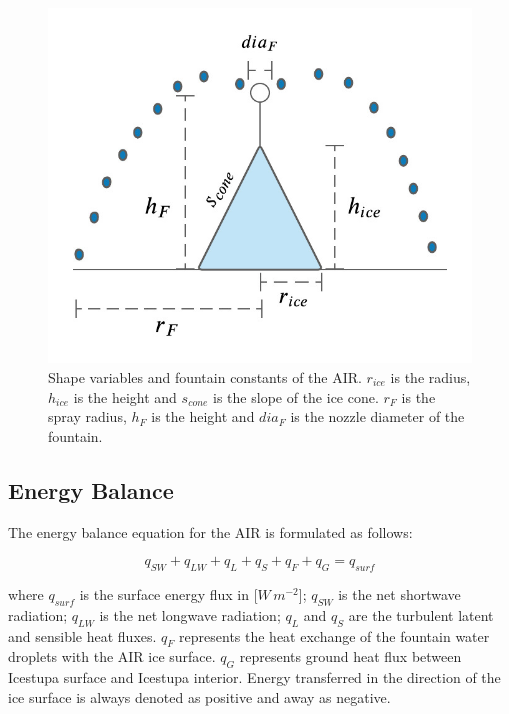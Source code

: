 \documentclass[utf8]{frontiersSCNS} %
\begin{document}
    \begin{figure} \begin{center} \includegraphics[width=10
cm]{Figures/Figure_5.jpg} \end{center} \caption{Shape variables and fountain constants of the AIR. $r_{ice}$ is
the radius, $h_{ice}$ is the height and $s_{cone}$ is the slope of the ice cone. $r_F$ is the spray radius, $h_F$ is the
height and $dia_F$ is the nozzle diameter of the fountain.} \label{fig:shape} \end{figure}

\subsection{Energy Balance} \label{section:EB}

The energy balance equation \citep{Hock_2005} for the AIR is formulated as follows:

\begin{equation} q_{SW} + q_{LW} + q_{L} + q_{S} + q_{F} + q_{G} = q_{surf} \label{eqn:EB} \end{equation}

where $q_{surf}$ is the surface energy flux in [$W\,m^{-2}$]; $q_{SW}$ is the net shortwave radiation; $q_{LW}$ is the
net longwave radiation; $q_{L}$ and $q_{S}$ are the turbulent latent and sensible heat fluxes. $q_{F}$ represents the heat
exchange of the fountain water droplets with the AIR ice surface. $q_{G}$ represents ground heat flux between Icestupa
surface and Icestupa interior. Energy transferred in the direction of the ice surface is always denoted as positive and
away as negative.  
\end{document}
